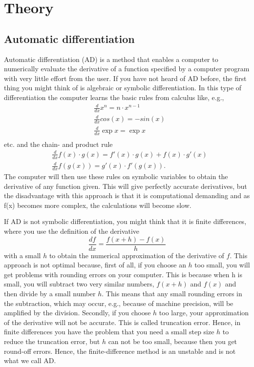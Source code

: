 \chapter{Theory}
\label{ch:theory}
\section{Automatic differentiation}
\label{sec:AD}
Automatic differentiation (AD) is a method that enables a computer to numerically evaluate the derivative of a function specified by a computer program with very little effort from the user. If you have not heard of AD before, the first thing you might think of is algebraic or symbolic differentiation. In this type of differentiation the computer learns the basic rules from calculus like, e.g.,
\begin{align*}
    &\frac{d}{dx}x^n     = n\cdot x^{n-1} \\
    &\frac{d}{dx}cos(x)  = -sin(x) \\
    &\frac{d}{dx}\exp{x} = \exp{x} \\
\end{align*}
etc. and the chain- and product rule
\begin{align*}
    &\frac{d}{dx}f(x)\cdot g(x) = f'(x)\cdot g(x) + f(x)\cdot g'(x) \\
    &\frac{d}{dx}f(g(x)) = g'(x)\cdot f'(g(x)).
\end{align*}
The computer will then use these rules on symbolic variables to obtain the derivative of any function given. This will give perfectly accurate derivatives, but the disadvantage with this approach is that it is computational demanding and as f(x) becomes more complex, the calculations will become slow.

If AD is not symbolic differentiation, you might think that it is finite differences, where you use the definition of the derivative
\begin{equation*}
    \frac{df}{dx} = \frac{f(x+h) - f(x)}{h}
\end{equation*}
with a small $h$ to obtain the numerical approximation of the derivative of $f$. This approach is not optimal because, first of all, if you choose an $h$ too small, you will get problems with rounding errors on your computer. This is because when h is small, you will subtract two very similar numbers, $f(x+h)$ and $f(x)$ and then divide by a small number $h$. This means that any small rounding errors in the subtraction, which may occur, e.g., because of machine precision, will be amplified by the division. Secondly, if you choose $h$ too large, your approximation of the derivative will not be accurate. This is called truncation error. Hence, in finite differences you have the problem that you need a small step size $h$ to reduce the truncation error, but $h$ can not be too small, because then you get round-off errors. Hence, the finite-difference method is an unstable and is not what we call AD.

